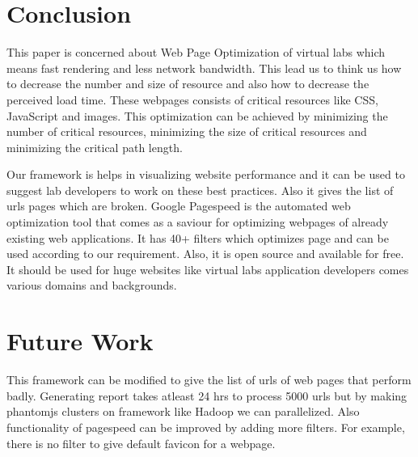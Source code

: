 \documentclass[conference]{IEEEtran}
\begin{document}
\section{Conclusion}
\label{sec-7}
This paper is concerned about Web Page Optimization of virtual labs which means fast rendering and less
network bandwidth. This lead us to think us how to decrease the number and size of
resource and also how to decrease the perceived load time. These webpages consists
of critical resources like CSS, JavaScript and images. This optimization can be
achieved by minimizing the number of critical resources, minimizing the size of
critical resources and minimizing the critical path length.

 Our framework is helps in visualizing website performance and
it can be used to suggest lab developers to work on these best practices. Also it
gives the list of urls pages which are broken. Google Pagespeed is the automated web optimization
tool that comes as a saviour for optimizing webpages of already existing web applications. It has 40+
filters which optimizes page and can be used according to our requirement. Also,
it is open source and available for free. It should be used for huge websites like virtual labs
application developers comes various domains and backgrounds.
 
\section{Future Work}\label{sec-8}
This framework can be modified to give the list of urls of web pages that perform badly.
Generating report takes atleast 24 hrs to process 5000 urls but by
making phantomjs clusters on framework like Hadoop we can parallelized. Also functionality of pagespeed
can be improved by adding more filters. For example, there is no filter to give default
favicon for a webpage.
\end{document}
